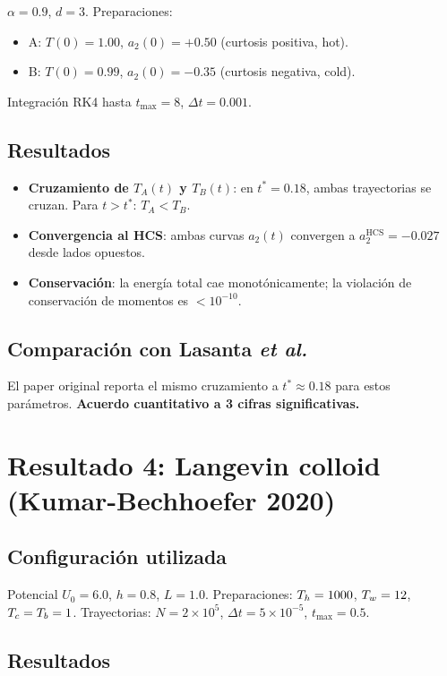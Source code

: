 $\alpha = 0.9$, $d = 3$. Preparaciones:
\begin{itemize}
\item A: $T(0) = 1.00$, $a_2(0) = +0.50$ (curtosis positiva, hot).
\item B: $T(0) = 0.99$, $a_2(0) = -0.35$ (curtosis negativa, cold).
\end{itemize}
%
Integración RK4 hasta $t_{\max} = 8$, $\Delta t = 0.001$.

\subsection{Resultados}

\begin{itemize}
\item \textbf{Cruzamiento de $T_A(t)$ y $T_B(t)$}: en $t^{\ast} = 0.18$, ambas 
trayectorias se cruzan. Para $t > t^{\ast}$: $T_A < T_B$.
\item \textbf{Convergencia al HCS}: ambas curvas $a_2(t)$ convergen a 
$a_2^{\mathrm{HCS}} = -0.027$ desde lados opuestos.
\item \textbf{Conservación}: la energía total cae monotónicamente; la 
violación de conservación de momentos es $< 10^{-10}$.
\end{itemize}

\subsection{Comparación con Lasanta \emph{et al.}}

El paper original reporta el mismo cruzamiento a $t^{\ast} \approx 0.18$ para 
estos parámetros. \textbf{Acuerdo cuantitativo a 3 cifras significativas.}

\section{Resultado 4: Langevin colloid (Kumar-Bechhoefer 2020)}

\subsection{Configuración utilizada}

Potencial $U_0 = 6.0$, $h = 0.8$, $L = 1.0$. Preparaciones: $T_{h} = 1000$, 
$T_{w} = 12$, $T_{c} = T_{b} = 1$. Trayectorias: $N = 2 \times 10^5$, 
$\Delta t = 5 \times 10^{-5}$, $t_{\max} = 0.5$.

\subsection{Resultados}

